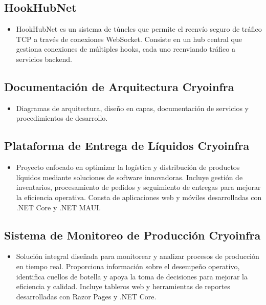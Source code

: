 \subsection*{HookHubNet}
\begin{itemize}[leftmargin=12pt]
    \item HookHubNet es un sistema de túneles que permite el reenvío seguro de tráfico TCP a través de conexiones WebSocket. Consiste en un hub central que gestiona conexiones de múltiples hooks, cada uno reenviando tráfico a servicios backend.
\end{itemize}

\subsection*{Documentación de Arquitectura Cryoinfra}
\begin{itemize}[leftmargin=12pt]
    \item Diagramas de arquitectura, diseño en capas, documentación de servicios y procedimientos de desarrollo.
\end{itemize}

\subsection*{Plataforma de Entrega de Líquidos Cryoinfra}
\begin{itemize}[leftmargin=12pt]
    \item Proyecto enfocado en optimizar la logística y distribución de productos líquidos mediante soluciones de software innovadoras. Incluye gestión de inventarios, procesamiento de pedidos y seguimiento de entregas para mejorar la eficiencia operativa. Consta de aplicaciones web y móviles desarrolladas con .NET Core y .NET MAUI.
\end{itemize}

\subsection*{Sistema de Monitoreo de Producción Cryoinfra}
\begin{itemize}[leftmargin=12pt]
    \item Solución integral diseñada para monitorear y analizar procesos de producción en tiempo real. Proporciona información sobre el desempeño operativo, identifica cuellos de botella y apoya la toma de decisiones para mejorar la eficiencia y calidad. Incluye tableros web y herramientas de reportes desarrolladas con Razor Pages y .NET Core.
\end{itemize}


